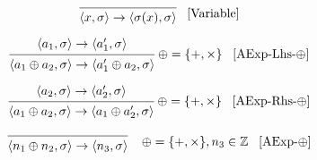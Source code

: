 \[
\begin{prooftree}
\infer0{
	\langle x, \sigma \rangle 
	\rightarrow  
	\langle \sigma(x), \sigma \rangle 
}
\end{prooftree} \; \; \; [\text{Variable}]
\]

\[
\begin{prooftree}
\hypo{
	\langle a_1, \sigma \rangle \rightarrow
	\langle a_1^\prime, \sigma \rangle 
} 
\infer1{
	\langle a_1 \oplus a_2, \sigma \rangle \rightarrow  
	\langle a_1^\prime \oplus a_2, \sigma \rangle
}
\end{prooftree} \; \oplus = \{+,\times\} \; \; \; [\text{AExp-Lhs-}\oplus]
\]

\[
\begin{prooftree}
\hypo{
	\langle a_2, \sigma \rangle \rightarrow
	\langle a_2^\prime, \sigma \rangle 
} 
\infer1{
	\langle a_1 \oplus a_2, \sigma \rangle \rightarrow  
	\langle a_1 \oplus a_2^\prime, \sigma \rangle
}
\end{prooftree} \; \oplus = \{+,\times\} \; \; \; [\text{AExp-Rhs-}\oplus]
\]

\[
\begin{prooftree}
\infer0{
	\langle n_1 \oplus n_2, \sigma \rangle \rightarrow  
	\langle n_3,  \sigma \rangle
}
\end{prooftree} \; \; \; \; \oplus = \{+,\times\}, n_3 \in \mathbb{Z} \; \; \; [\text{AExp-}\oplus]
\]

